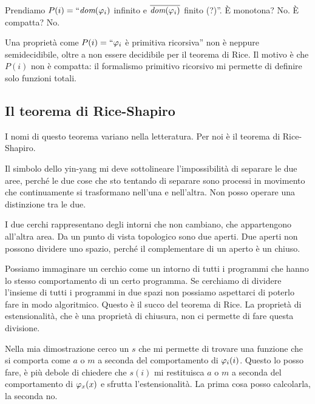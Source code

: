 Prendiamo $P(i) = ``\textit{dom}(\varphi_{i})$ infinito e $\overline{\textit{dom}(\varphi_{i})}$ finito (?)''. È monotona? No. È
compatta? No.

Una proprietà come $P(i) = `` \varphi_{i}$ è primitiva ricorsiva'' non è neppure semidecidibile, oltre a non
essere decidibile per il teorema di Rice. Il motivo è che $P(i)$ non è compatta: il formalismo
primitivo ricorsivo mi permette di definire solo funzioni totali.

\subsection{Il teorema di Rice-Shapiro}

I nomi di questo teorema variano nella letteratura. Per noi è il teorema di Rice-Shapiro.

Il simbolo dello yin-yang mi deve sottolineare l'impossibilità di separare le due aree, perché le
due cose che sto tentando di separare sono processi in movimento che continuamente si trasformano
nell'una e nell'altra. Non posso operare una distinzione tra le due.

I due cerchi rappresentano degli intorni che non cambiano, che appartengono all'altra area. Da un
punto di vista topologico sono due aperti. Due aperti non possono dividere uno spazio, perché il
complementare di un aperto è un chiuso.

Possiamo immaginare un cerchio come un intorno di tutti i programmi che hanno lo stesso
comportamento di un certo programma. Se cerchiamo di dividere l'insieme di tutti i programmi in due
spazi non possiamo aspettarci di poterlo fare in modo algoritmico. Questo è il succo del teorema
di Rice. La proprietà di estensionalità, che è una proprietà di chiusura, non ci permette di
fare questa divisione.

Nella mia dimostrazione cerco un $s$ che mi permette di trovare una funzione che si comporta come
$a$ o $m$ a seconda del comportamento di $\varphi_{i}(i)$. Questo lo posso fare, è più debole di
chiedere che $s(i)$ mi restituisca $a$ o $m$ a seconda del comportamento di $\varphi_{x}(x)$ e sfrutta
l'estensionalità. La prima cosa posso calcolarla, la seconda no.


